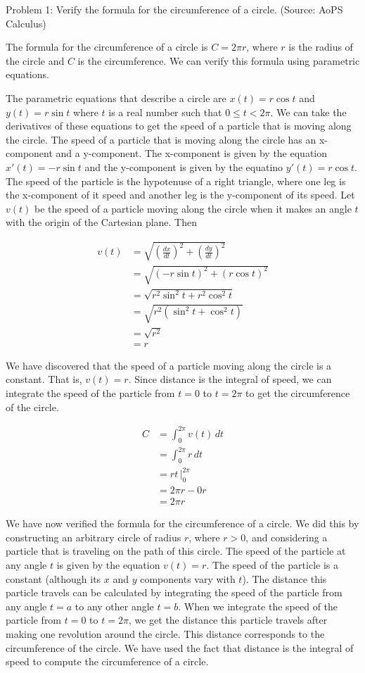 Problem 1: Verify the formula for the circumference of a circle. (Source: AoPS Calculus)

The formula for the circumference of a circle is $C = 2\pi r$, where $r$ is the radius of the circle and $C$ is the circumference. We can verify this formula using parametric equations.

The parametric equations that describe a circle are $x(t) = r\cos t$ and $y(t) = r\sin t$ where $t$ is a real number such that $0 \leq t < 2 \pi$. We can take the derivatives of these equations to get the speed of a particle that is moving along the circle. The speed of a particle that is moving along the circle has an x-component and a y-component. The x-component is given by the equation $x'(t) = -r\sin t$ and the y-component is given by the equatino $y'(t) = r\cos t$. The speed of the particle is the hypotenuse of a right triangle, where one leg is the x-component of it speed and another leg is the y-component of its speed. Let $v(t)$ be the speed of a particle moving along the circle when it makes an angle $t$ with the origin of the Cartesian plane. Then

\begin{align*}
v(t) &= \sqrt{\left(\frac{dx}{dt}\right)^2 + \left(\frac{dy}{dt}\right)^2} \\
&= \sqrt{\left(-r\sin t\right)^2 + \left(r\cos t\right)^2} \\
&= \sqrt{r^2\sin^2 t + r^2 \cos^2 t} \\
&= \sqrt{r^2(\sin^2 t + \cos^2 t)} \\
&= \sqrt{r^2} \\
&= r
\end{align*}

We have discovered that the speed of a particle moving along the circle is a constant. That is, $v(t) = r$. Since distance is the integral of speed, we can integrate the speed of the particle from $t = 0$ to $t = 2\pi$ to get the circumference of the circle.

\begin{align*}
C &= \int_{0}^{2\pi} v(t) \, dt \\
&= \int_{0}^{2\pi} r \, dt \\
&= rt \, \Bigg|_{0}^{2\pi} \\
&= 2\pi r - 0r \\
&= \boxed{2\pi r}
\end{align*}

We have now verified the formula for the circumference of a circle. We did this by constructing an arbitrary circle of radius $r$, where $r > 0$, and considering a particle that is traveling on the path of this circle. The speed of the particle at any angle $t$ is given by the equation $v(t) = r$. The speed of the particle is a constant (although its $x$ and $y$ components vary with $t$). The distance this particle travels can be calculated by integrating the speed of the particle from any angle $t = a$ to any other angle $t = b$. When we integrate the speed of the particle from $t = 0$ to $t = 2\pi$, we get the distance this particle travels after making one revolution around the circle. This distance corresponds to the circumference of the circle. We have used the fact that distance is the integral of speed to compute the circumference of a circle.
